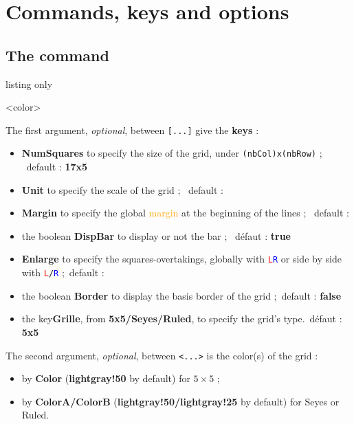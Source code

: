 \documentclass[a4paper]{article}
\newcommand\Cle[1]{{\bfseries\sffamily\textlangle #1\textrangle}}
\begin{document}
\pagebreak

\section{Commands, keys and options}

\subsection{The command}

\begin{PresentationCode}{listing only}

\DispGrid[keys]<color>
\end{PresentationCode}

The first argument, \textit{optional}, between \texttt{[...]} give the \Cle{keys} :

\begin{itemize}
	\item \Cle{NumSquares} to specify the size of the grid, under \texttt{(nbCol)x(nbRow)} ; \hfill~default : \Cle{17x5}
	\item \Cle{Unit} to specify the scale of the grid ; \hfill~default : \Cle{1}
	\item \Cle{Margin} to specify the global \textcolor{orange}{margin} at the beginning of the lines ; \hfill~default : \Cle{0}
	\item the boolean \Cle{DispBar} to display or not the bar ; \hfill~défaut : \Cle{true}
	\item \Cle{Enlarge} to specify the squares-overtakings, globally with \texttt{\textcolor{red}{L}\textcolor{blue}{R}} or side by side with \texttt{\textcolor{red}{L}/\textcolor{blue}{R}} ;\hfill~default : \Cle{0}
	\item the boolean \Cle{Border} to display the basis border of the grid ;\hfill~default : \Cle{false}
	\item the key\Cle{Grille}, from \Cle{5x5/Seyes/Ruled}, to specify the grid's type.\hfill~défaut : \Cle{5x5}
\end{itemize}

The second argument, \textit{optional}, between \texttt{<...>} is the color(s) of the grid :

\begin{itemize}
	\item by \Cle{Color} (\Cle{lightgray!50} by default) for $5\times5$  ;
	\item by \Cle{ColorA/ColorB} (\Cle{lightgray!50/lightgray!25} by default) for Seyes or Ruled.
\end{itemize}
\end{document}
